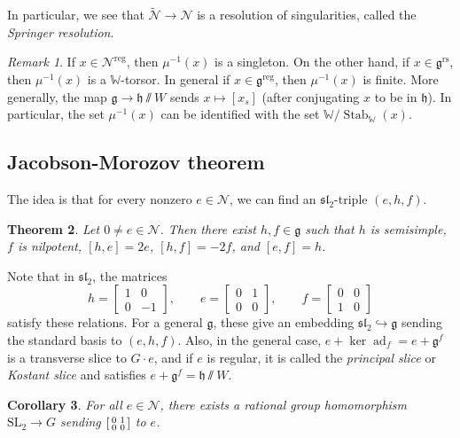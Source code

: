 \documentclass{amsart}
\newtheorem{thm}{Theorem}[section]
\newtheorem{cor}[thm]{Corollary}
\theoremstyle{definition}
\theoremstyle{remark}
\newtheorem{rmk}[thm]{Remark}
\theoremstyle{plain}
\theoremstyle{definition}
\theoremstyle{remark}
\newcommand{\g}{\mathfrak{g}}
\newcommand{\h}{\mathfrak{h}}
\newcommand{\mc}[1]{\mathcal{#1}}
\newcommand{\mf}[1]{\mathfrak{#1}}
\newcommand{\mbb}[1]{\mathbb{#1}}
\newcommand{\mr}[1]{\mathrm{#1}}
\newcommand{\on}[1]{\operatorname{#1}}
\newcommand{\1}{\mathbf{1}}
\newcommand{\2}{\mathbf{2}}
\newcommand{\3}{\mathbf{3}}
\newcommand{\SL}{\mr{SL}}
\renewcommand{\sl}{\mf{sl}}
\DeclareMathOperator{\ad}{ad}
\begin{document}
In particular, we see that \(\tilde{\mc{N}} \to \mc{N}\) is a resolution of singularities, called the \textit{Springer resolution}.

\begin{rmk}
    If \(x \in \mc{N}^{\on{reg}}\), then \(\mu^{-1}(x)\) is a singleton. On the other hand, if \(x \in \g^{\on{rs}}\), then \(\mu^{-1}(x)\) is a \(\mbb{W}\)-torsor. In general if \(x \in \g^{\on{reg}}\), then \(\mu^{-1}(x)\) is finite. More generally, the map \(\g \to \h \sslash W\) sends \(x \mapsto [x_s]\) (after conjugating \(x\) to be in \(\h\)). In particular, the set \(\mu^{-1}(x)\) can be identified with the set \(\mbb{W} / \on{Stab}_{\mbb{W}}(x)\).
\end{rmk}

\subsection{Jacobson-Morozov theorem}%
\label{sub:Jacobson-Morozov theorem}

The idea is that for every nonzero \(e \in \mc{N}\), we can find an \(\sl_2\)-triple \((e,h,f)\).

\begin{thm}\label{thm:Jacobson-Morozov}
    Let \(0 \neq e \in \mc{N}\). Then there exist \(h, f \in \g\) such that \(h\) is semisimple, \(f\) is nilpotent, \([h,e] = 2e\), \([h,f] = -2f\), and \([e,f] = h\).
\end{thm}

Note that in \(\sl_2\), the matrices
\[ h = \begin{bmatrix}
    1 & 0 \\
    0 & -1
\end{bmatrix}, \qquad e = \begin{bmatrix}
    0 & 1 \\
    0 & 0
\end{bmatrix}, \qquad f = \begin{bmatrix}
    0 & 0 \\
    1 & 0
\end{bmatrix} \]
satisfy these relations. For a general \(\g\), these give an embedding \(\sl_2 \hookrightarrow \g\) sending the standard basis to \((e,h,f)\). Also, in the general case, \(e + \ker \ad_f = e + \g^f\) is a transverse slice to \(G \cdot e\), and if \(e\) is regular, it is called the \textit{principal slice} or \textit{Kostant slice} and satisfies \(e + \g^f = \h \sslash W\).

\begin{cor}
    For all \(e \in \mc{N}\), there exists a rational group homomorphism \(\SL_2 \to G\) sending \(\begin{bsmallmatrix} 0 & 1 \\ 0 & 0 \end{bsmallmatrix}\) to \(e\).
\end{cor}
\end{document}
